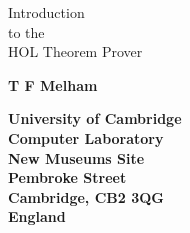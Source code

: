 


\renewcommand{\textfraction}{0.01}	  %
\setcounter{totalnumber}{10}	 	  %
\flushbottom				  %
\pagestyle{slides}			  %
\setlength{\unitlength}{1mm}		  %







\bsectitle
Introduction\\
to the\\
HOL Theorem Prover\\
\esectitle

\vskip20mm

\begin{center}
\large\bf
T F Melham
\end{center}
\vskip10mm
\begin{center}
\bf
University of Cambridge\\
Computer Laboratory\\
New Museums Site\\
Pembroke Street\\
Cambridge, CB2 3QG\\
England
\end{center}

